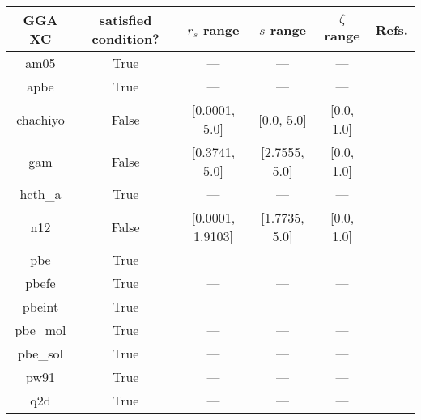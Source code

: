 \begin{tabular}{|c|c|c|c|c|l|}
\hline
  GGA XC &  satisfied condition? &      $r_s$ range &     $s$ range & $\zeta$ range  &                                                 Refs. \\ \hline
    am05 &                  True &              --- &           --- &            --- &        \cite{Armiento2005_085108,Mattsson2008_084714} \\ \hline
    apbe &                  True &              --- &           --- &            --- &                          \cite{Constantin2011_186406} \\ \hline
chachiyo &                 False &    [0.0001, 5.0] &    [0.0, 5.0] &     [0.0, 1.0] &                            \cite{Chachiyo2020_112669} \\ \hline
     gam &                 False &    [0.3741, 5.0] & [2.7555, 5.0] &     [0.0, 1.0] &                                   \cite{Yu2015_12146} \\ \hline
 hcth\_a &                  True &              --- &           --- &            --- &                             \cite{Hamprecht1998_6264} \\ \hline
     n12 &                 False & [0.0001, 1.9103] & [1.7735, 5.0] &     [0.0, 1.0] &                              \cite{Peverati2012_2310} \\ \hline
     pbe &                  True &              --- &           --- &            --- &            \cite{Perdew1996_3865,Perdew1996_3865_err} \\ \hline
   pbefe &                  True &              --- &           --- &            --- &                                 \cite{Perez2015_3844} \\ \hline
  pbeint &                  True &              --- &           --- &            --- &                             \cite{Fabiano2010_113104} \\ \hline
pbe\_mol &                  True &              --- &           --- &            --- &                            \cite{delCampo2012_104108} \\ \hline
pbe\_sol &                  True &              --- &           --- &            --- &                              \cite{Perdew2008_136406} \\ \hline
    pw91 &                  True &              --- &           --- &            --- & \cite{Perdew1991,Perdew1992_6671,Perdew1992_6671_err} \\ \hline
     q2d &                  True &              --- &           --- &            --- &                              \cite{Chiodo2012_126402} \\ \hline

\end{tabular}
